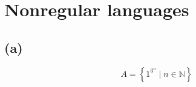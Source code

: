 


\setcounter{section}{2}

\section{Nonregular languages}

\subsection{(a)}

$$
A = \left\{ 1^{3^{n}} \mid n \in \mathbb{N} \right\}
$$







